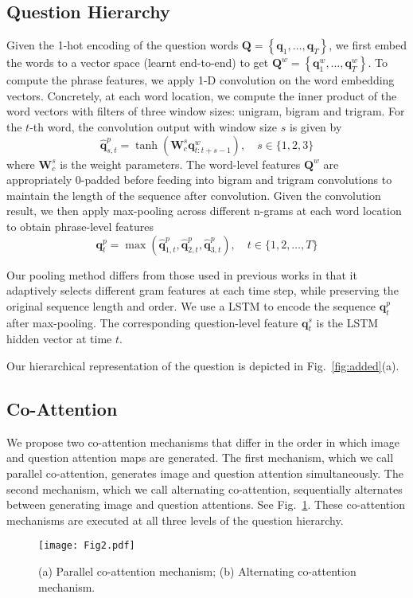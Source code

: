 \documentclass{article}
\begin{document}
\subsection{Question Hierarchy}
\label{subsec:hierarchy}
Given the 1-hot encoding of the question words $\bm{Q}=\left\lbrace \bm{q}_1,\ldots, \bm{q}_T \right\rbrace$, we first embed the words to a vector space (learnt end-to-end) to get  $\bm{Q}^w = \left\lbrace \bm{q}^w_1,\ldots, \bm{q}^w_T \right\rbrace$. To compute the phrase features, we apply 1-D convolution on the word embedding vectors. Concretely, at each word location, we compute the inner product of the word vectors with filters of three window sizes: unigram, bigram and trigram. For the $t$-th word, the convolution output with window size $s$ is given by
\begin{equation}
\hat{\bm{q}}^p_{s,t}=\tanh(\bm{W}_c^s \bm{q}^w_{t:t+s-1}), \quad s\in \{1,2,3\}
\end{equation}
where $\bm{W}_c^s$ is the weight parameters. The word-level features $\bm{Q}^w$  are appropriately 0-padded before feeding into bigram and trigram convolutions to maintain the length of the sequence after convolution. Given the convolution result, we then apply max-pooling across different n-grams at each word location to obtain phrase-level features
\begin{equation}
\bm{q}^p_{t} = \max (\hat{\bm{q}}^p_{1,t}, \hat{\bm{q}}^p_{2,t}, \hat{\bm{q}}^p_{3,t}), \quad t \in \{1, 2,\ldots,T \}
\end{equation}

Our pooling method differs from those used in previous works \cite{hu2014convolutional} in that it adaptively selects different gram features at each time step, while preserving the original sequence length and order.
We use a LSTM to encode the sequence $\bm{q}^p_t$ after max-pooling. The corresponding question-level feature $\bm{q}^s_{t}$ is the LSTM hidden vector at time $t$. 

Our hierarchical representation of the question is depicted in Fig.~\ref{fig:added}(a).
\subsection{Co-Attention}
\label{subsec:co-attention}
We propose two co-attention mechanisms that differ in the order in which image and question attention maps are generated. The first mechanism, which we call parallel co-attention, generates image and question attention simultaneously. The second mechanism, which we call alternating co-attention, sequentially alternates between generating image and question attentions. See Fig.~\ref{fig:model}. These co-attention mechanisms are executed at all three levels of the question hierarchy.
\begin{figure}[t]
 \centering 
 \texttt{[image: Fig2.pdf]}
 \caption{(a) Parallel co-attention mechanism; (b) Alternating co-attention mechanism.}
 \label{fig:model}
\end{figure}
\end{document}
